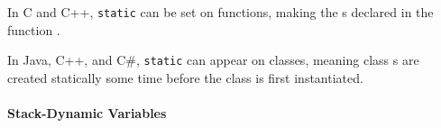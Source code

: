 \begin{remark*}
  In C and C++, \texttt{static} can be set on functions, making the s declared in the function .
\end{remark*}

\begin{remark*}
  In Java, C++, and C\#, \texttt{static} can appear on classes, meaning class s are created statically some time before the class is first instantiated.
\end{remark*}

\paragraph{Stack-Dynamic Variables}\label{par:Stack-Dynamic_Variable_Binding_Lifetime}
